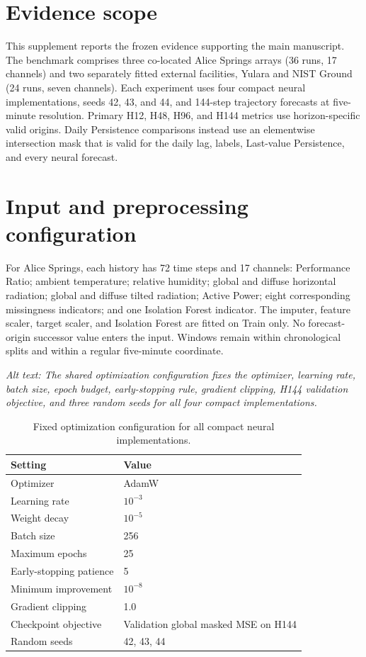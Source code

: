 \section{Evidence scope}
This supplement reports the frozen evidence supporting the main manuscript. The benchmark comprises three co-located Alice Springs arrays (36 runs, 17 channels) and two separately fitted external facilities, Yulara and NIST Ground (24 runs, seven channels). Each experiment uses four compact neural implementations, seeds 42, 43, and 44, and 144-step trajectory forecasts at five-minute resolution. Primary H12, H48, H96, and H144 metrics use horizon-specific valid origins. Daily Persistence comparisons instead use an elementwise intersection mask that is valid for the daily lag, labels, Last-value Persistence, and every neural forecast.

\section{Input and preprocessing configuration}
For Alice Springs, each history has 72 time steps and 17 channels: Performance Ratio; ambient temperature; relative humidity; global and diffuse horizontal radiation; global and diffuse tilted radiation; Active Power; eight corresponding missingness indicators; and one Isolation Forest indicator. The imputer, feature scaler, target scaler, and Isolation Forest are fitted on Train only. No forecast-origin successor value enters the input. Windows remain within chronological splits and within a regular five-minute coordinate.

\begin{table}[h]
\caption{Fixed optimization configuration for all compact neural implementations.}
\par\small\textit{Alt text: The shared optimization configuration fixes the optimizer, learning rate, batch size, epoch budget, early-stopping rule, gradient clipping, H144 validation objective, and three random seeds for all four compact implementations.}\par
\centering
\begin{tabular}{ll}
\toprule Setting & Value\\
\midrule
Optimizer & AdamW\\
Learning rate & $10^{-3}$\\
Weight decay & $10^{-5}$\\
Batch size & 256\\
Maximum epochs & 25\\
Early-stopping patience & 5\\
Minimum improvement & $10^{-8}$\\
Gradient clipping & 1.0\\
Checkpoint objective & Validation global masked MSE on H144\\
Random seeds & 42, 43, 44\\
\bottomrule
\end{tabular}
\end{table}

